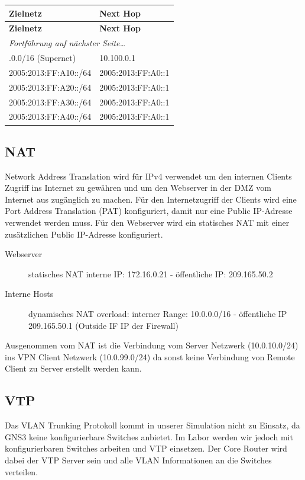 \documentclass[11pt,a4paper,parskip=half]{scrartcl}
\begin{document}
\begin{longtable}{p{4.5cm}|p{4cm}}
	\textbf{Zielnetz} & \textbf{Next Hop}\\
	\hline
	\endfirsthead
	\textbf{Zielnetz} & \textbf{Next Hop}\\
	\hline
	\endhead
	\hline
	\multicolumn{2}{l}{\textit{Fortführung auf nächster Seite\ldots}} \\
	\endfoot
	\endlastfoot
	10.0.0.0/16 (Supernet) & 10.100.0.1\\
	2005:2013:FF:A10::/64 & 2005:2013:FF:A0::1\\
	2005:2013:FF:A20::/64 & 2005:2013:FF:A0::1\\
	2005:2013:FF:A30::/64 & 2005:2013:FF:A0::1\\
	2005:2013:FF:A40::/64 & 2005:2013:FF:A0::1
\end{longtable}

\subsection{NAT}
Network Address Translation wird für IPv4 verwendet um den internen Clients Zugriff ins Internet zu gewähren und um den Webserver in der DMZ vom Internet aus zugänglich zu machen. Für den Internetzugriff der Clients wird eine Port Address Translation (PAT) konfiguriert, damit nur eine Public IP-Adresse verwendet werden muss. Für den Webserver wird ein statisches NAT mit einer zusätzlichen Public IP-Adresse konfiguriert.

\begin{description}
	\item[Webserver] statisches NAT interne IP: 172.16.0.21 - öffentliche IP: 209.165.50.2
	\item[Interne Hosts] dynamisches NAT overload: interner Range: 10.0.0.0/16 - öffentliche IP 209.165.50.1 (Outside IF IP der Firewall)
\end{description}
Ausgenommen vom NAT ist die Verbindung vom Server Netzwerk (10.0.10.0/24) ins VPN Client Netzwerk (10.0.99.0/24) da sonst keine Verbindung von Remote Client zu Server erstellt werden kann.

\subsection{VTP}
Das VLAN Trunking Protokoll kommt in unserer Simulation nicht zu Einsatz, da GNS3 keine konfigurierbare Switches anbietet. Im Labor werden wir jedoch mit konfigurierbaren Switches arbeiten und VTP einsetzen. Der Core Router wird dabei der VTP Server sein und alle VLAN Informationen an die Switches verteilen.
\end{document}
